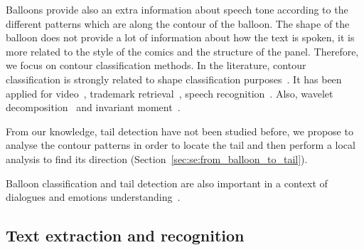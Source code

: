 
Balloons provide also an extra information about speech tone according to the different patterns which are along the contour of the balloon.
The shape of the balloon does not provide a lot of information about how the text is spoken, it is more related to the style of the comics and the structure of the panel.
Therefore, we focus on contour classification methods.
In the literature, contour classification is strongly related to shape classification purposes~\cite{sun2005classification,liu1990partial}.
It has been applied for video~\cite{kuhne2001motion,richter2001contour,bader2009}, trademark retrieval~\cite{leung2002trademark}, speech recognition~\cite{grigoriu1994automatic}.
Also, wavelet decomposition~\cite{tieng1997recognition} and invariant moment~\cite{mukundan1998moment}. 

From our knowledge, tail detection have not been studied before, we propose to analyse the contour patterns in order to locate the tail and then perform a local analysis to find its direction (Section~\ref{sec:se:from_balloon_to_tail}).

Balloon classification and tail detection are also important in a context of dialogues and emotions understanding~\cite{millidge2009comic}.









\subsection{Text extraction and recognition}
\label{sec:sota:text}

